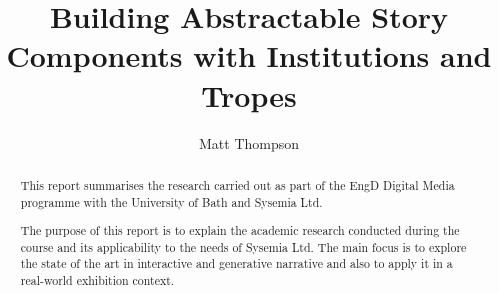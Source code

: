 \documentclass[11pt]{report}
\title{Building Abstractable Story Components with Institutions and Tropes}
\author{Matt Thompson}
\begin{document}
\maketitle
\clearpage
\tableofcontents
\clearpage

\begin{abstract}
This report summarises the research carried out as part of the EngD Digital Media programme with the University of Bath and Sysemia Ltd.

The purpose of this report is to explain the academic research conducted during the course and its applicability to the needs of Sysemia Ltd. The main focus is to explore the state of the art in interactive and generative narrative and also to apply it in a real-world exhibition context.
\end{abstract}












\end{document}
